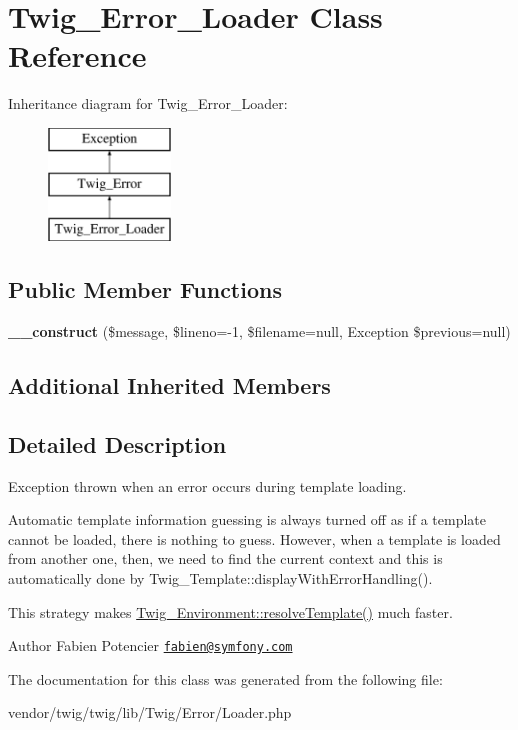 \hypertarget{classTwig__Error__Loader}{}\section{Twig\+\_\+\+Error\+\_\+\+Loader Class Reference}
\label{classTwig__Error__Loader}
Inheritance diagram for Twig\+\_\+\+Error\+\_\+\+Loader\+:\begin{figure}[H]
\begin{center}
\leavevmode
\includegraphics[height=3.000000cm]{classTwig__Error__Loader}
\end{center}
\end{figure}
\subsection*{Public Member Functions}
\begin{DoxyCompactItemize}
\item 
{\bfseries \+\_\+\+\_\+construct} (\$message, \$lineno=-\/1, \$filename=null, Exception \$previous=null)\hypertarget{classTwig__Error__Loader_a4957bb0c2125a72a6aef2c11a909f2c7}{}\label{classTwig__Error__Loader_a4957bb0c2125a72a6aef2c11a909f2c7}

\end{DoxyCompactItemize}
\subsection*{Additional Inherited Members}


\subsection{Detailed Description}
Exception thrown when an error occurs during template loading.

Automatic template information guessing is always turned off as if a template cannot be loaded, there is nothing to guess. However, when a template is loaded from another one, then, we need to find the current context and this is automatically done by Twig\+\_\+\+Template\+::display\+With\+Error\+Handling().

This strategy makes \hyperlink{classTwig__Environment_af498f9376646cf23e7a13dcd7ef48f4d}{Twig\+\_\+\+Environment\+::resolve\+Template()} much faster.

\begin{DoxyAuthor}{Author}
Fabien Potencier \href{mailto:fabien@symfony.com}{\tt fabien@symfony.\+com} 
\end{DoxyAuthor}


The documentation for this class was generated from the following file\+:\begin{DoxyCompactItemize}
\item 
vendor/twig/twig/lib/\+Twig/\+Error/Loader.\+php\end{DoxyCompactItemize}
